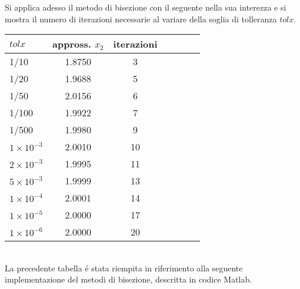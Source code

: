 \noindent Si applica adesso il metodo di bisezione con il seguente nella sua interezza e si mostra il numero di iterazioni necessarie al variare della soglia di tolleranza \(tolx\).\\

\begin{tabular}{l*{6}{c}}
 \(tolx\) & appross. \(x_2\) & iterazioni \\
\hline
 1/10 & 1.8750 & 3\\
 1/20 & 1.9688 & 5\\
 1/50 & 2.0156 & 6\\
 1/100 & 1.9922 & 7\\
 1/500 & 1.9980 & 9\\
 \(1 \times 10^{-3}\) & 2.0010 & 10\\
 \(2 \times 10^{-3}\) & 1.9995 & 11\\
 \(5 \times 10^{-3}\) & 1.9999 & 13\\
 \(1 \times 10^{-4}\) & 2.0001 & 14\\
 \(1 \times 10^{-5}\) & 2.0000 & 17\\
 \(1 \times 10^{-6}\) & 2.0000 & 20\\
\end{tabular} \\

\noindent La precedente tabella \'e stata riempita in riferimento alla seguente implementazione del metodi di bisezione, descritta in codice Matlab.\\


